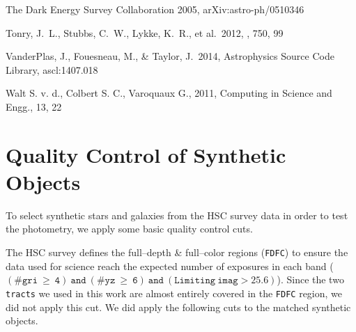 \documentclass[useamsfonts]{pasj01}
\def\tracts{\texttt{tracts}}
\begin{document}
\begin{thebibliography}{}
     The Dark Energy
             Survey Collaboration 2005, arXiv:astro-ph/0510346

     Tonry, J.~L., Stubbs, C.~W., Lykke, K.~R.,
             et al.\ 2012, \apj, 750, 99

     VanderPlas, J., Fouesneau, M., \&
             Taylor, J.\ 2014, Astrophysics Source Code Library, ascl:1407.018

     Walt S. v. d., Colbert S. C., Varoquaux G.,
             2011, Computing in Science and Engg., 13, 22

\end{thebibliography}


\appendix
\section{Quality Control of Synthetic Objects}
    \label{app:qc}

    To select synthetic stars and galaxies from the HSC survey data in order to test the photometry,
    we apply some basic quality control cuts.

    The HSC survey defines the full--depth \& full--color regions (\texttt{FDFC}) to
    ensure the data used for science reach the expected number of exposures in each
    band
    ($\mathtt{(\#gri\ \geq\ 4)\ and\ (\#yz\ \geq\ 6)\ and\ (Limiting\ imag> 25.6)}$).
    Since the two \tracts{} we used in this work are almost entirely covered in
    the \texttt{FDFC} region, we did not apply this cut.
    We did apply the following cuts to the matched synthetic objects.
\end{document}
